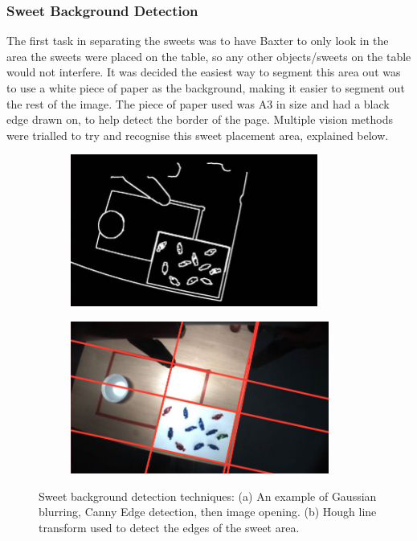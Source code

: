 \subsubsection{Sweet Background Detection}
The first task in separating the sweets was to have Baxter to only look in the area the sweets were placed on the table, so any other objects/sweets on the table would not interfere. It was decided the easiest way to segment this area out was to use a white piece of paper as the background, making it easier to segment out the rest of the image. The piece of paper used was A3 in size and had a black edge drawn on, to help detect the border of the page. Multiple vision methods were trialled to try and recognise this sweet placement area, explained below.
\begin{figure}[H]
    \captionsetup[subfigure]{justification=centering}
    \begin{subfigure}[H]{0.475\textwidth}   
        \centering 
        \caption{}
        \includegraphics[width=\textwidth, height=5cm]{cannedge.jpg}
        \label{fig:edgeImage}
    \end{subfigure}
    \begin{subfigure}[H]{0.475\textwidth}   
        \centering 
        \caption{}
        \includegraphics[width=\textwidth, height=5cm]{houghline.png}
        \label{fig:houghline}
    \end{subfigure}
    \vspace{-0.5cm}
    \caption{Sweet background detection techniques: (a) An example of Gaussian blurring, Canny Edge detection, then image opening. (b) Hough line transform used to detect the edges of the sweet area.}
\end{figure}
